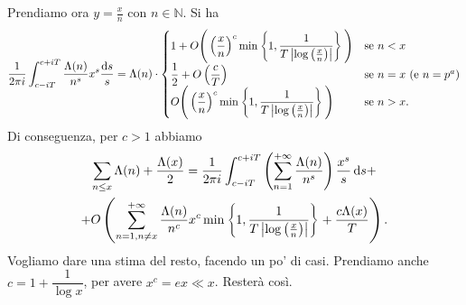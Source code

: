 Prendiamo ora $y=\frac{x}{n}$ con $n \in \mathbb{N}$. Si ha
$$\frac{1}{2\pi i}\int_{c-iT}^{c+iT} \frac{\Lambda(n)}{n^s}x^s\frac{\mathop{}\!\mathrm{d} s}{s}=\Lambda(n)\cdot \begin{cases}
  1+O\Bigg(\left(\dfrac{x}{n}\right)^c\min\left\{1,\dfrac{1}{T\left|\log\left(\frac{x}{n}\right)\right|}\right\}\Bigg) & \mbox{se }n < x \\
  \dfrac{1}{2}+O\left(\dfrac{c}{T}\right) & \mbox{se }n=x \text{ (e }n=p^a\text{)} \\
  O\Bigg(\left(\dfrac{x}{n}\right)^c\min\left\{1,\dfrac{1}{T\left|\log\left(\frac{x}{n}\right)\right|}\right\}\Bigg) & \mbox{se }n>x.
\end{cases}$$
Di conseguenza, per $c>1$ abbiamo
\begin{gather*}
  \sum_{n \le x} \Lambda(n)+\frac{\Lambda(x)}{2}=\frac{1}{2\pi i}\int_{c-iT}^{c+iT} \left(\sum_{n=1}^{+\infty}\frac{\Lambda(n)}{n^s}\right)\frac{x^s}{s}\mathop{}\!\mathrm{d} s+\\
  +O\left(\sum_{n=1,n\not=x}^{+\infty} \frac{\Lambda(n)}{n^c}x^c\min\left\{1,\frac{1}{T\left|\log\left(\frac{x}{n}\right)\right|}\right\}+\frac{c\Lambda(x)}{T}\right).
\end{gather*}
Vogliamo dare una stima del resto, facendo un po' di casi. Prendiamo anche $c=1+\dfrac{1}{\log{x}}$, per avere $x^c=ex \ll x$. Resterà così.
